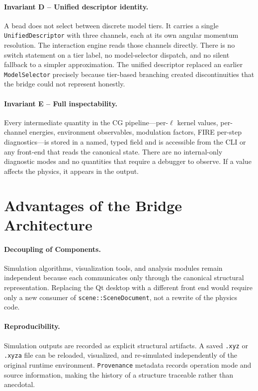 ﻿\documentclass[11pt]{article}
\newcommand{\type}[1]{\texttt{#1}}
\begin{document}
\paragraph{Invariant D -- Unified descriptor identity.}
A bead does not select between discrete model tiers. It carries a single
\type{UnifiedDescriptor} with three channels, each at its own angular
momentum resolution. The interaction engine reads those channels directly.
There is no switch statement on a tier label, no model-selector dispatch, and
no silent fallback to a simpler approximation. The unified descriptor
replaced an earlier \type{ModelSelector} precisely because tier-based
branching created discontinuities that the bridge could not represent honestly.

\paragraph{Invariant E -- Full inspectability.}
Every intermediate quantity in the CG pipeline---per-$\ell$ kernel values,
per-channel energies, environment observables, modulation factors, FIRE
per-step diagnostics---is stored in a named, typed field and is accessible
from the CLI or any front-end that reads the canonical state. There are no
internal-only diagnostic modes and no quantities that require a debugger to
observe. If a value affects the physics, it appears in the output.
\section{Advantages of the Bridge Architecture}

\paragraph{Decoupling of Components.}
Simulation algorithms, visualization tools, and analysis modules remain
independent because each communicates only through the canonical structural
representation. Replacing the Qt desktop with a different front end would
require only a new consumer of \type{scene::SceneDocument}, not a rewrite of
the physics code.

\paragraph{Reproducibility.}
Simulation outputs are recorded as explicit structural artifacts. A saved
\texttt{.xyz} or \texttt{.xyza} file can be reloaded, visualized, and
re-simulated independently of the original runtime environment.
\type{Provenance} metadata records operation mode and source information,
making the history of a structure traceable rather than anecdotal.
\end{document}
